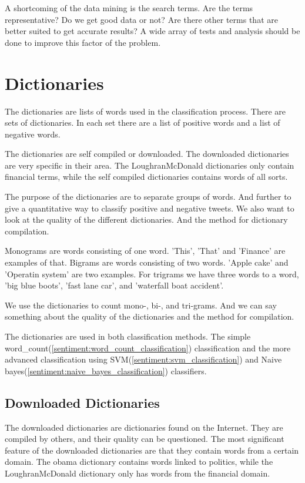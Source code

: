 A shortcoming of the data mining is the search terms. Are the terms
representative? Do we get good data or not? Are there other terms that are
better suited to get accurate results? A wide array of tests and analysis should
be done to improve this factor of the problem. 
%

\section{Dictionaries}\label{data:dictionaries}

The dictionaries are lists of words used in the classification process. There
are sets of dictionaries. In each set there are a list of positive words and a list of negative words. 

The dictionaries are self compiled or downloaded. The downloaded dictionaries
are very specific in their area. The LoughranMcDonald dictionaries only contain
financial terms, while the self compiled dictionaries contains words of all
sorts. 

The purpose of the dictionaries are to separate groups of words. And
further to give a quantitative way to classify positive and negative tweets.
We also want to look at the quality of the different dictionaries. And the
method for dictionary compilation.  

Monograms are words consisting of one word. 'This', 'That' and 'Finance' are
examples of that. Bigrams are words consisting of two words. 'Apple cake' and
'Operatin system' are two examples. For trigrams we have three words to a word,
'big blue boots', 'fast lane car', and 'waterfall boat accident'. 

We use the dictionaries to count mono-, bi-, and tri-grams.
And we can say something about the quality of the dictionaries and the method
for compilation.

The dictionaries are used in both classification methods. The simple
word\_count(\ref{sentiment:word_count_classification}) classification and the
more advanced classification using SVM(\ref{sentiment:svm_classification}) and
Naive bayes(\ref{sentiment:naive_bayes_classification}) classifiers. 
%

\subsection{Downloaded Dictionaries}
The downloaded dictionaries are dictionaries found on the Internet. They are
compiled by others, and their quality can be questioned. The most significant
feature of the downloaded dictionaries are that they contain words from a
certain domain. The obama dictionary contains words linked to politics,
while the LoughranMcDonald dictionary only has words from the financial domain.  

